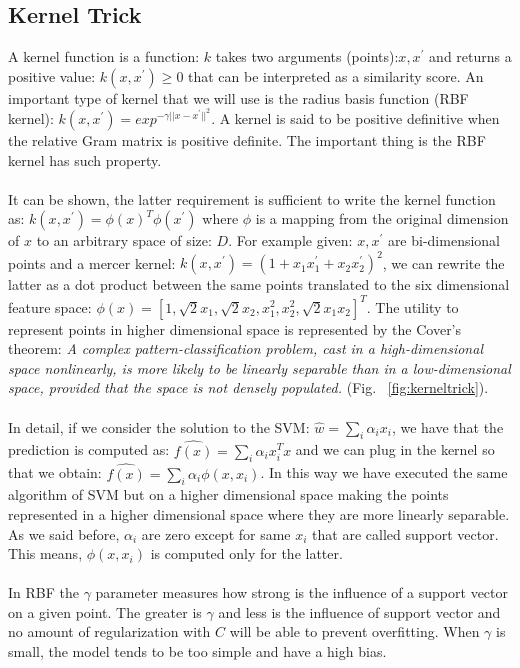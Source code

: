 \documentclass[LaM,binding=0.6cm]{sapthesis}
\begin{document}
\subsection{Kernel Trick}
A kernel function is a function: $k$ takes two arguments (points):$x,x^{'}$ and returns a positive value: $k(x,x^{'}) \geq0$ that can be interpreted as a similarity score. An important type of kernel that we will use is the radius basis function (RBF kernel): $k(x,x^{'})=exp^{-\gamma||x-x^{'}||^{2}}$. A kernel is said to be positive definitive when the relative Gram matrix is positive definite. The important thing is the RBF kernel has such property.\\\\It can be shown, the latter requirement is sufficient to write the kernel function as: $k(x,x^{'})=\phi(x)^{T}\phi(x^{'})$ where $\phi$ is a mapping from the original dimension of $x$ to an arbitrary space of size: $D$. For example given: $x,x^{'}$ are bi-dimensional points and a mercer kernel: $k(x,x^{'})=(1 + x_1x^{'}_1 + x_2x^{'}_2)^{2}$, we can rewrite the latter as a dot product between the same points translated to the six dimensional feature space: $\phi(x)=[1, \sqrt{2}x_1, \sqrt{2}x_2, x^{2}_1,x^{2}_2, \sqrt{2}x_1x_2]^{T}$. The utility to represent points in higher dimensional space is represented by the Cover's theorem: \textit{ A complex pattern-classification problem, cast in a high-dimensional space nonlinearly, is more likely to be linearly separable than in a low-dimensional space, provided that the space is not densely populated.} (Fig. ~\ref{fig:kerneltrick}).\\\\In detail, if we consider the solution to the SVM: $\hat{w}=\sum_i\alpha_ix_i$, we have that the prediction is computed as: $\widehat{f(x)}=\sum_i\alpha_ix_i^{T}x$ and we can plug in the kernel so that we obtain: $\widehat{f(x)}=\sum_i\alpha_i\phi(x,x_i)$. In this way we have executed the same algorithm of SVM but on a higher dimensional space making the points represented in a higher dimensional space where they are more linearly separable. As we said before, $\alpha_i$ are zero except for same $x_i$ that are called support vector. This means, $\phi(x,x_i)$ is computed only for the latter.\\\\In RBF the $\gamma$ parameter measures how strong is the influence of a support vector on a given point. The greater is $\gamma$ and less is the influence of support vector and no amount of regularization with $C$ will be able to prevent overfitting. When $\gamma$ is small, the model tends to be too simple and have a high bias.
\end{document}

